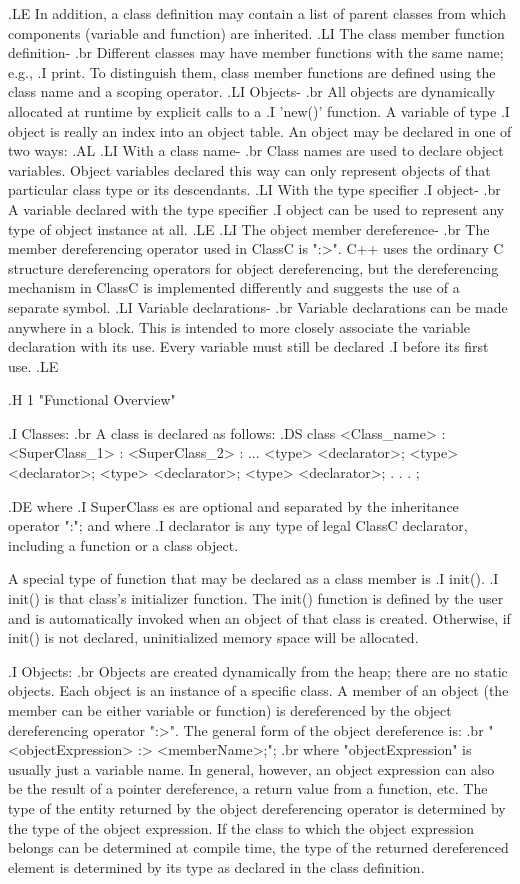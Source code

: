 .LE
In addition,
a class definition may contain a list of parent classes from which
components (variable and function) are inherited.
.LI
The class member function definition-
.br
Different classes may have member functions with the same name; e.g.,
.I print.
To distinguish them, class member functions are defined using the class name
and a scoping operator.
.LI
Objects-
.br
All objects are dynamically allocated at runtime by explicit calls to
a
.I 'new()'
function.
A variable of type
.I object
is really an index into an object table.
An object may be declared in one of two ways:
.AL
.LI
With a class name-
.br
Class names are used to declare object variables.  Object variables declared
this way can only represent objects of that particular
class type or its descendants.
.LI
With the type specifier
.I object-
.br
A variable declared with the type specifier
.I object
can be used to represent any type of object instance at all.
.LE
.LI
The object member dereference-
.br
The member dereferencing operator used in ClassC is ":>".
C++ uses the ordinary C structure dereferencing operators for object
dereferencing, but the dereferencing mechanism in ClassC is implemented
differently and suggests the use of a separate symbol.
.LI
Variable declarations-
.br
Variable declarations can be made anywhere in a block.
This is intended to more closely associate the variable declaration
with its use.  Every variable must still
be declared
.I before
its first use.
.LE

.H 1 "Functional Overview"

.I Classes:
.br
A class is declared as follows:
.DS
class <Class_name>  : <SuperClass_1>  : <SuperClass_2> : ...
	{	<type> <declarator>;
	 	<type> <declarator>;
	 	<type> <declarator>;
	 	<type> <declarator>;
			.
			.
			.
	};

.DE
where
.I SuperClass es
are optional and separated by the inheritance operator ":"; and where
.I declarator
is any type of legal ClassC declarator, including a function
or a class object.

A special type of
function that may be declared as a class member is
.I init().
.I init()
is that class's initializer function.  The init() function is defined by
the user and is automatically invoked when an
object of that class is created.  Otherwise, if init() is not declared,
uninitialized memory space will be allocated.

.I Objects:
.br
Objects are created dynamically from the heap; there are no static objects.
Each object is an instance of a specific class.
A member of an object (the member can be either variable or function)
is dereferenced by the object dereferencing operator ":>".  The general
form of the object dereference is:
.br
"<objectExpression> :> <memberName>;";
.br
where "objectExpression" is usually just a variable name.  In general,
however, an object expression can also be the result of a pointer
dereference, a return value from a function, etc.
The type of the entity returned by the object dereferencing operator is
determined by the type of the object expression.  If the class to which
the object
expression belongs can be determined at compile time, the
type of the returned dereferenced element is determined by its type as
declared in the class definition.

